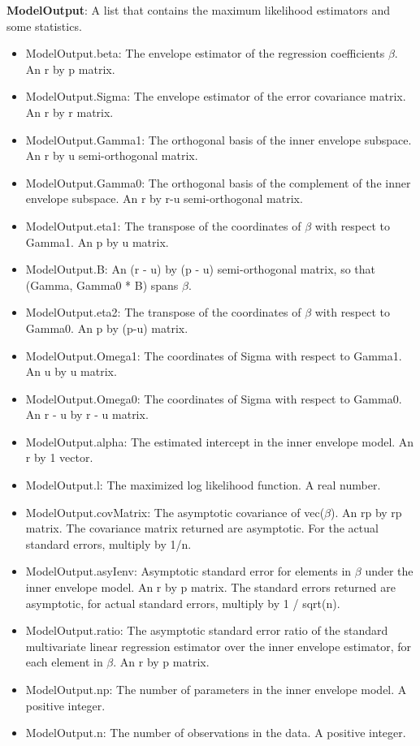 \documentclass[a4paper,11pt,openany]{memoir}
\begin{document}
\begin{par}
\textbf{ModelOutput}: A list that contains the maximum likelihood estimators and some statistics.
\end{par} \vspace{1em}
\begin{itemize}
\setlength{\itemsep}{-1ex}
   \item ModelOutput.beta: The envelope estimator of the regression coefficients $\beta$. An r by p matrix.
   \item ModelOutput.Sigma: The envelope estimator of the error covariance matrix.  An r by r matrix.
   \item ModelOutput.Gamma1: The orthogonal basis of the inner envelope subspace. An r by u semi-orthogonal matrix.
   \item ModelOutput.Gamma0: The orthogonal basis of the complement of the inner envelope subspace.  An r by r-u semi-orthogonal matrix.
   \item ModelOutput.eta1: The transpose of the coordinates of $\beta$ with respect to Gamma1. An p by u matrix.
   \item ModelOutput.B: An (r - u) by (p - u) semi-orthogonal matrix, so that (Gamma, Gamma0 * B) spans $\beta$.
   \item ModelOutput.eta2: The transpose of the coordinates of $\beta$ with respect to Gamma0. An p by (p-u) matrix.
   \item ModelOutput.Omega1: The coordinates of Sigma with respect to Gamma1. An u by u matrix.
   \item ModelOutput.Omega0: The coordinates of Sigma with respect to Gamma0. An r - u by r - u matrix.
   \item ModelOutput.alpha: The estimated intercept in the inner envelope model.  An r by 1 vector.
   \item ModelOutput.l: The maximized log likelihood function.  A real number.
   \item ModelOutput.covMatrix: The asymptotic covariance of vec($\beta$).  An rp by rp matrix.  The covariance matrix returned are asymptotic.  For the actual standard errors, multiply by 1/n.
   \item ModelOutput.asyIenv: Asymptotic standard error for elements in $\beta$ under the inner envelope model.  An r by p matrix.  The standard errors returned are asymptotic, for actual standard errors, multiply by 1 / sqrt(n).
   \item ModelOutput.ratio: The asymptotic standard error ratio of the standard multivariate linear regression estimator over the inner envelope estimator, for each element in $\beta$.  An r by p matrix.
   \item ModelOutput.np: The number of parameters in the inner envelope model.  A positive integer.
   \item ModelOutput.n: The number of observations in the data.  A positive integer.
\end{itemize}
\end{document}
